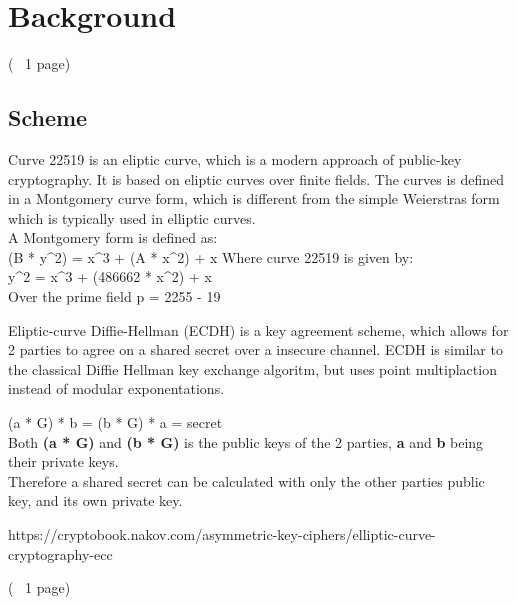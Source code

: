 \section{Background}

(~ 1 page)
\subsection{Scheme}
Curve 22519 is an eliptic curve, which is a modern approach of public-key cryptography. It is based on eliptic curves over finite fields.
The curves is defined in a Montgomery curve form, which is different from the simple Weierstras form which is typically used in elliptic curves.\\
A Montgomery form is defined as:\\
(B * y^2) = x^3 + (A * x^2) + x
Where curve 22519 is given by:\\
y^2 = x^3 + (486662 * x^2) + x\\
Over the prime field 
p = 2255 - 19

Eliptic-curve Diffie-Hellman (ECDH) is a key agreement scheme, which allows for 2 parties to agree on a shared secret over a insecure channel.
ECDH is similar to the classical Diffie Hellman key exchange algoritm, but uses point multiplaction instead of modular exponentations.

(a * G) * b = (b * G) * a = secret\\

Both \textbf{(a * G)} and \textbf{(b * G)} is the public keys of the 2 parties, \textbf{a} and \textbf{b} being their private keys.\\
Therefore a shared secret can be calculated with only the other parties public key, and its own private key.



https://cryptobook.nakov.com/asymmetric-key-ciphers/elliptic-curve-cryptography-ecc


(~ 1 page)
